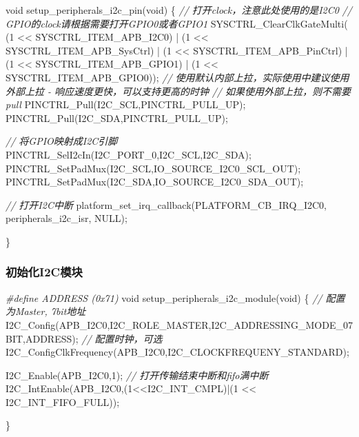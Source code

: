 \documentclass[
  12pt,
]{book}
\newenvironment{Shaded}{\begin{snugshade}}{\end{snugshade}}
\newcommand{\CommentTok}[1]{\textcolor[rgb]{0.56,0.35,0.01}{\textit{#1}}}
\newcommand{\DataTypeTok}[1]{\textcolor[rgb]{0.13,0.29,0.53}{#1}}
\newcommand{\DecValTok}[1]{\textcolor[rgb]{0.00,0.00,0.81}{#1}}
\newcommand{\NormalTok}[1]{#1}
\newcommand{\PreprocessorTok}[1]{\textcolor[rgb]{0.56,0.35,0.01}{\textit{#1}}}
\begin{document}
\begin{Shaded}
\begin{Highlighting}[]
\DataTypeTok{void}\NormalTok{ setup_peripherals_i2c_pin(}\DataTypeTok{void}\NormalTok{)}
\NormalTok{\{}
  \CommentTok{// 打开clock，注意此处使用的是I2C0}
  \CommentTok{// GPIO的clock请根据需要打开GPIO0或者GPIO1}
\NormalTok{  SYSCTRL_ClearClkGateMulti(    (}\DecValTok{1}\NormalTok{ << SYSCTRL_ITEM_APB_I2C0)}
\NormalTok{                                | (}\DecValTok{1}\NormalTok{ << SYSCTRL_ITEM_APB_SysCtrl)}
\NormalTok{                                | (}\DecValTok{1}\NormalTok{ << SYSCTRL_ITEM_APB_PinCtrl)}
\NormalTok{                                | (}\DecValTok{1}\NormalTok{ << SYSCTRL_ITEM_APB_GPIO1)}
\NormalTok{                                | (}\DecValTok{1}\NormalTok{ << SYSCTRL_ITEM_APB_GPIO0));}
  \CommentTok{// 使用默认内部上拉，实际使用中建议使用外部上拉 - 响应速度更快，可以支持更高的时钟}
  \CommentTok{// 如果使用外部上拉，则不需要pull}
\NormalTok{  PINCTRL_Pull(I2C_SCL,PINCTRL_PULL_UP);}
\NormalTok{  PINCTRL_Pull(I2C_SDA,PINCTRL_PULL_UP);}
  
  \CommentTok{// 将GPIO映射成I2C引脚}
\NormalTok{  PINCTRL_SelI2cIn(I2C_PORT_0,I2C_SCL,I2C_SDA);}
\NormalTok{  PINCTRL_SetPadMux(I2C_SCL,IO_SOURCE_I2C0_SCL_OUT);}
\NormalTok{  PINCTRL_SetPadMux(I2C_SDA,IO_SOURCE_I2C0_SDA_OUT);}
  
  \CommentTok{// 打开I2C中断}
\NormalTok{  platform_set_irq_callback(PLATFORM_CB_IRQ_I2C0, peripherals_i2c_isr, NULL);}
  
\NormalTok{\}}
\end{Highlighting}
\end{Shaded}

\hypertarget{ux521dux59cbux5316i2cux6a21ux5757}{%
\subsubsection{初始化I2C模块}\label{ux521dux59cbux5316i2cux6a21ux5757}}

\begin{Shaded}
\begin{Highlighting}[]
\PreprocessorTok{#define ADDRESS (0x71)}
\DataTypeTok{void}\NormalTok{ setup_peripherals_i2c_module(}\DataTypeTok{void}\NormalTok{)}
\NormalTok{\{}
  \CommentTok{// 配置为Master, 7bit地址}
\NormalTok{  I2C_Config(APB_I2C0,I2C_ROLE_MASTER,I2C_ADDRESSING_MODE_07BIT,ADDRESS);}
  \CommentTok{// 配置时钟，可选}
\NormalTok{  I2C_ConfigClkFrequency(APB_I2C0,I2C_CLOCKFREQUENY_STANDARD);}
  
\NormalTok{  I2C_Enable(APB_I2C0,}\DecValTok{1}\NormalTok{);}
  \CommentTok{// 打开传输结束中断和fifo满中断}
\NormalTok{  I2C_IntEnable(APB_I2C0,(}\DecValTok{1}\NormalTok{<<I2C_INT_CMPL)|(}\DecValTok{1}\NormalTok{ << I2C_INT_FIFO_FULL));}

\NormalTok{\}}
\end{Highlighting}
\end{Shaded}
\end{document}

